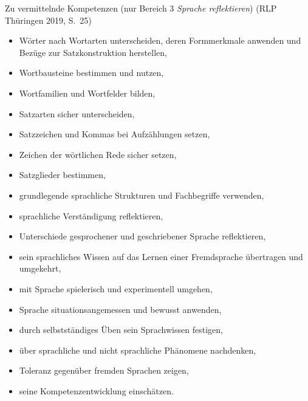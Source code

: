 \begin{frame}
  {Zu vermittelnde Kompetenzen (nur Bereich 3 \textit{Sprache reflektieren})}
  \onslide<+->
  \onslide<+->
   (RLP Thüringen 2019, S.~25)\\
  \onslide<+->
  \Halbzeile
  \begin{itemize}\tiny
    \item Wörter nach Wortarten unterscheiden, deren Formmerkmale anwenden und Bezüge zur Satzkonstruktion herstellen,
    \item Wortbausteine bestimmen und nutzen,
    \item Wortfamilien und Wortfelder bilden,
    \item Satzarten sicher unterscheiden,
    \item Satzzeichen und Kommas bei Aufzählungen setzen,
    \item Zeichen der wörtlichen Rede sicher setzen,
    \item Satzglieder bestimmen,
    \item grundlegende sprachliche Strukturen und Fachbegriffe verwenden,
    \item sprachliche Verständigung reflektieren,
    \item Unterschiede gesprochener und geschriebener Sprache reflektieren,
    \item sein sprachliches Wissen auf das Lernen einer Fremdsprache übertragen und umgekehrt,
    \item mit Sprache spielerisch und experimentell umgehen,
    \item Sprache situationsangemessen und bewusst anwenden,
    \item durch selbstständiges Üben sein Sprachwissen festigen,
    \item über sprachliche und nicht sprachliche Phänomene nachdenken,
    \item Toleranz gegenüber fremden Sprachen zeigen,
    \item seine Kompetenzentwicklung einschätzen.
  \end{itemize}
  \onslide<+->
  \onslide<+->
  \onslide<+->
  \Halbzeile
  \centering 
\end{frame}

